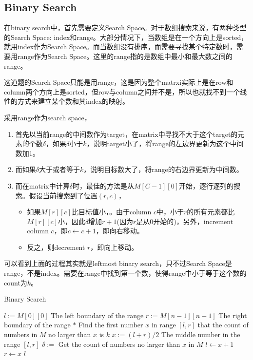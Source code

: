 \subsection{Binary Search}
在binary search中，首先需要定义Search Space。对于数组搜索来说，有两种类型的Search Space: index和range。大部分情况下，当数组是在一个方向上是sorted，就用index作为Search Space。而当数组没有排序，而需要寻找某个特定数时，需要用range作为Search Space。这里的range指的是数组中最小和最大数之间的range。
\par
这道题的Search Space只能是用range，这是因为整个matrxi实际上是在row和column两个方向上是sorted，但row与column之间并不是，所以也就找不到一个线性的方式来建立某个数和其index的映射。
\par
采用range作为search space，
\begin{enumerate}
\item 首先以当前range的中间数作为target，在matrix中寻找不大于这个target的元素的个数$\delta$，如果$\delta$小于$k$，说明target小了，将range的左边界更新为这个中间数加1。
\item 而如果$\delta$大于或者等于$k$，说明目标数大了，将range的右边界更新为中间数。
\item 而在matrix中计算$\delta$时，最佳的方法是从$M[C-1][0]$开始，逐行逐列的搜索。假设当前搜索到了位置$(r,c)$，
\begin{itemize}
\item 如果$M[r][c]$比目标值小，。由于column $c$中，小于$r$的所有元素都比$M[r][c]$小，因此$\delta$增加$r+1$(因为$r$是从0开始的)，另外，increment column $c$，即$c\gets c+1$，即向右移动。
\item 反之，则decrement $r$，即向上移动。
\end{itemize}
\end{enumerate}
可以看到上面的过程其实就是leftmost binary search，只不过Search Space是range，不是index。需要在range中找到第一个数，使得range中小于等于这个数的count为$k$。

\setcounter{algorithm}{0}
\begin{algorithm}[H]
\caption{Binary Search}
\begin{algorithmic}[1]
\State $l:=M[0][0]$ \Comment The left boundary of the range
\State $r:=M[n-1][n-1]$ \Comment The right boundary of the range
\State $\ast$ Find the first number $x$ in range $[l,r]$ that the count of numbers in $M$ no larger than $x$ is $k$
\State $x:=(l+r)/2$ \Comment The middle number in the range $[l, r]$
\State $\delta:=$ \Comment Get the count of numbers no larger than $x$ in $M$
\State $l\gets x+1$
\Else
\State $r\gets x$
\EndIf
\EndWhile
\State \Return $l$
\EndProcedure
\end{algorithmic}
\end{algorithm}

